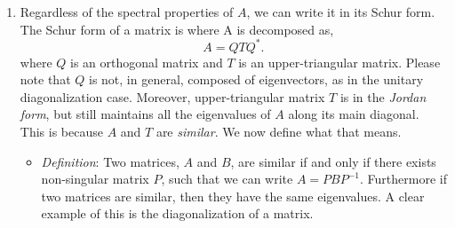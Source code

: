 \documentclass[paper=a4, fontsize=11pt]{scrartcl} %
\newtheorem{theorem}{Theorem}
\numberwithin{equation}{section} %
\numberwithin{figure}{section} %
\numberwithin{table}{section} %
\begin{document}
\begin{enumerate}
\begin{itemize}
\begin{proof}
\begin{enumerate}
Hence we have $$ \lambda <\textbf{x},\textbf{y}> =  \mu <\textbf{x},\textbf{y}>,$$ but since we assumed $\mu\neq\lambda$, this implies that $<\textbf{x},\textbf{y}>=0.$\\ 

I have to admit this is a more long winded way to show this property of Hermitian matrices. Since we are assuming $A$ is full rank, we can diagonalize $A$, e.g., let $$A=X\Lambda X^{-1},$$

and now since $A=A^{*}$, we have $$A^{*} = ( X\Lambda X^{-1})^{*} = (X^{-1})^{*} \Lambda^{*} X^{*} = ( X\Lambda X^{-1})^{*} = (X^{-1})^{*} \Lambda X^{*},$$

since all the eigenvalues are real. However this must be equal to the original diagonalization of $A$ because $A$ is Hermitian. Therefore we have that $$X=(X^{-1})^{*} \ \ \ \mbox{ and } \ \ \ X^{-1} = X^{*}.$$

The only way this above statement could be true is if $X^{*}=X^{-1}$, which makes $X$ an orthogonal matrix, and our result falls out. 

\end{enumerate}
\end{proof}

In fact, we can extend this to all matrices that are normal! \\
\begin{theorem} A matrix is unitary diagonalizable if and only if it is normal. \end{theorem}  Recall that a matrix, $A$, is \emph{normal} if $AA^{*} = A^{*}A$.
\end{itemize}


\item Regardless of the spectral properties of $A$, we can write it in its Schur form. The Schur form of a matrix is where A is decomposed as, $$A=QTQ^{*}.$$ where $Q$ is an orthogonal matrix and $T$ is an upper-triangular matrix. Please note that $Q$ is not, in general, composed of eigenvectors, as in the unitary diagonalization case. Moreover, upper-triangular matrix $T$ is in the \emph{Jordan form}, but still maintains all the eigenvalues of $A$ along its main diagonal. This is because $A$ and $T$ are \emph{similar}. We now define what that means.

\begin{itemize}
\item \emph{Definition}: Two matrices, $A$ and $B$, are similar if and only if there exists non-singular matrix $P$, such that we can write $A=PBP^{-1}.$ Furthermore if two matrices are similar, then they have the same eigenvalues. A clear example of this is the diagonalization of a matrix. 
\end{itemize}


\end{enumerate}
\end{document}
